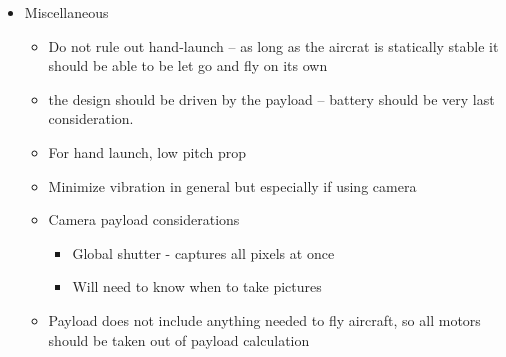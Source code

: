 \documentclass{article}
\begin{document}
\begin{spacing}{1.1}
\begin{itemize}
\item Miscellaneous 

\begin{itemize}
\item Do not rule out hand-launch -- as long as the aircrat is statically stable it should be able to be let go and fly on its own
\item the design should be driven by the payload -- battery should be very last consideration.
\item For hand launch, low pitch prop
\item Minimize vibration in general but especially if using camera
\item Camera payload considerations
\begin{itemize}
\item Global shutter - captures all pixels at once
\item Will need to know when to take pictures
\end{itemize}
\item Payload does not include anything needed to fly aircraft, so all motors should be taken out of payload calculation
\end{itemize}



\end{itemize}

\end{spacing}
\end{document}
